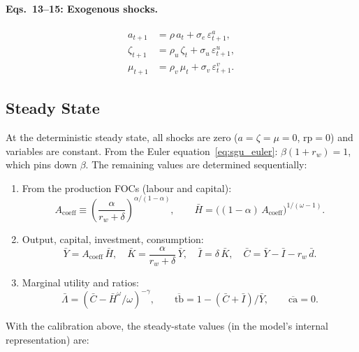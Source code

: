\documentclass[11pt,a4paper]{article}
\theoremstyle{definition}
\begin{document}
	\paragraph{Eqs.~13--15: Exogenous shocks.}
	\begin{align}
		a_{t+1} &= \rho\, a_t + \sigma_e\, \varepsilon_{t+1}^a, \label{eq:sgu_tfp}\\
		\zeta_{t+1} &= \rho_u\, \zeta_t + \sigma_u\, \varepsilon_{t+1}^u, \label{eq:sgu_zeta}\\
		\mu_{t+1} &= \rho_v\, \mu_t + \sigma_v\, \varepsilon_{t+1}^v. \label{eq:sgu_mu}
	\end{align}

	\subsection{Steady State}
	\label{sec:sgu_ss}

	At the deterministic steady state, all shocks are zero ($a = \zeta = \mu = 0$, $\text{rp} = 0$) and variables are constant.
	From the Euler equation~\eqref{eq:sgu_euler}: $\beta(1 + r_w) = 1$, which pins down $\beta$.
	The remaining values are determined sequentially:

	\begin{enumerate}
		\item From the production FOCs (labour and capital):
		\[
			A_{\text{coeff}} \equiv \left(\frac{\alpha}{r_w + \delta}\right)^{\alpha/(1-\alpha)}, \qquad
			\bar{H} = \bigl((1-\alpha)\, A_{\text{coeff}}\bigr)^{1/(\omega - 1)}.
		\]

		\item Output, capital, investment, consumption:
		\[
			\bar{Y} = A_{\text{coeff}}\,\bar{H}, \quad
			\bar{K} = \frac{\alpha}{r_w + \delta}\,\bar{Y}, \quad
			\bar{I} = \delta\,\bar{K}, \quad
			\bar{C} = \bar{Y} - \bar{I} - r_w\,\bar{d}.
		\]

		\item Marginal utility and ratios:
		\[
			\bar{\Lambda} = (\bar{C} - \bar{H}^\omega/\omega)^{-\gamma}, \qquad
			\overline{\text{tb}} = 1 - (\bar{C} + \bar{I})/\bar{Y}, \qquad
			\overline{\text{ca}} = 0.
		\]
	\end{enumerate}

	With the calibration above, the steady-state values (in the model's internal representation) are:
\end{document}
